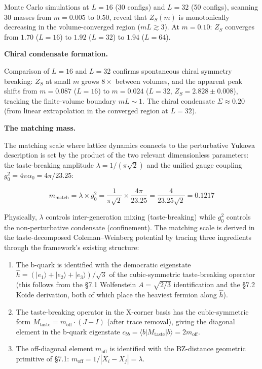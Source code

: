 \documentclass[
]{article}
\begin{document}
Monte Carlo simulations at \(L = 16\) (30 configs) and \(L = 32\) (50
configs), scanning 30 masses from \(m = 0.005\) to \(0.50\), reveal that
\(Z_S(m)\) is monotonically decreasing in the volume-converged region
(\(mL \gtrsim 3\)). At \(m = 0.10\): \(Z_S\) converges from \(1.70\)
(\(L{=}16\)) to \(1.92\) (\(L{=}32\)) to \(1.94\) (\(L{=}64\)).

\textbf{Chiral condensate formation.}

Comparison of \(L = 16\) and \(L = 32\) confirms spontaneous chiral
symmetry breaking: \(Z_S\) at small \(m\) grows \(8\times\) between
volumes, and the apparent peak shifts from \(m = 0.087\) (\(L{=}16\)) to
\(m = 0.024\) (\(L{=}32\), \(Z_S = 2.828 \pm 0.008\)), tracking the
finite-volume boundary \(mL \sim 1\). The chiral condensate
\(\Sigma \approx 0.20\) (from linear extrapolation in the converged
region at \(L = 32\)).

\textbf{The matching mass.}

The matching scale where lattice dynamics connects to the perturbative
Yukawa description is set by the product of the two relevant
dimensionless parameters: the taste-breaking amplitude
\(\lambda = 1/(\pi\sqrt{2})\) and the unified gauge coupling
\(g_0^2 = 4\pi\alpha_0 = 4\pi/23.25\):

\[m_{\text{match}} = \lambda \times g_0^2 = \frac{1}{\pi\sqrt{2}} \times \frac{4\pi}{23.25} = \frac{4}{23.25\sqrt{2}} = 0.1217\]

Physically, \(\lambda\) controls inter-generation mixing
(taste-breaking) while \(g_0^2\) controls the non-perturbative
condensate (confinement). The matching scale is derived in the
taste-decomposed Coleman--Weinberg potential by tracing three
ingredients through the framework's existing structure:

\begin{enumerate}
\def\labelenumi{(\roman{enumi})}
\item
  The b-quark is identified with the democratic eigenstate
  \(\hat{h} = (|e_1\rangle + |e_2\rangle + |e_3\rangle)/\sqrt{3}\) of
  the cubic-symmetric taste-breaking operator (this follows from the
  §7.1 Wolfenstein \(A = \sqrt{2/3}\) identification and the §7.2 Koide
  derivation, both of which place the heaviest fermion along
  \(\hat{h}\)).
\item
  The taste-breaking operator in the X-corner basis has the
  cubic-symmetric form
  \(M_{\text{taste}} = m_{\text{off}} \cdot (J - I)\) (after trace
  removal), giving the diagonal element in the b-quark eigenstate
  \(c_{bb} = \langle b | M_{\text{taste}} | b \rangle = 2 m_{\text{off}}\).
\item
  The off-diagonal element \(m_{\text{off}}\) is identified with the
  BZ-distance geometric primitive of §7.1:
  \(m_{\text{off}} = 1/|X_i - X_j| = \lambda\).
\end{enumerate}
\end{document}
